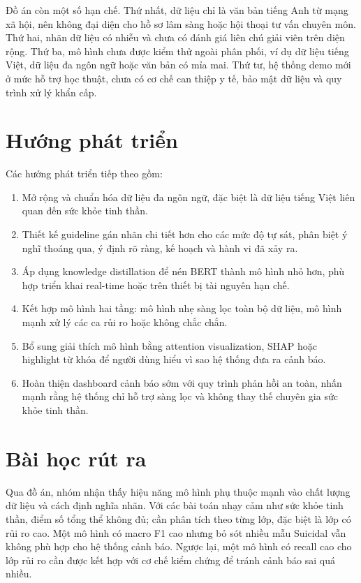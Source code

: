 \documentclass[12pt,a4paper,oneside]{report}
\newlength{\manualparindent}
\newcommand{\manualindent}{\hspace*{\manualparindent}}
\begin{document}
\manualindent%
Đồ án còn một số hạn chế. Thứ nhất, dữ liệu chỉ là văn bản tiếng Anh từ mạng xã hội, nên không đại diện cho hồ sơ lâm sàng hoặc hội thoại tư vấn chuyên môn. Thứ hai, nhãn dữ liệu có nhiễu và chưa có đánh giá liên chú giải viên trên diện rộng. Thứ ba, mô hình chưa được kiểm thử ngoài phân phối, ví dụ dữ liệu tiếng Việt, dữ liệu đa ngôn ngữ hoặc văn bản có mỉa mai. Thứ tư, hệ thống demo mới ở mức hỗ trợ học thuật, chưa có cơ chế can thiệp y tế, bảo mật dữ liệu và quy trình xử lý khẩn cấp.

\section{Hướng phát triển}

Các hướng phát triển tiếp theo gồm:

\begin{enumerate}[label=\arabic*.]
  \item Mở rộng và chuẩn hóa dữ liệu đa ngôn ngữ, đặc biệt là dữ liệu tiếng Việt liên quan đến sức khỏe tinh thần.
  \item Thiết kế guideline gán nhãn chi tiết hơn cho các mức độ tự sát, phân biệt ý nghĩ thoáng qua, ý định rõ ràng, kế hoạch và hành vi đã xảy ra.
  \item Áp dụng knowledge distillation để nén BERT thành mô hình nhỏ hơn, phù hợp triển khai real-time hoặc trên thiết bị tài nguyên hạn chế.
  \item Kết hợp mô hình hai tầng: mô hình nhẹ sàng lọc toàn bộ dữ liệu, mô hình mạnh xử lý các ca rủi ro hoặc không chắc chắn.
  \item Bổ sung giải thích mô hình bằng attention visualization, SHAP hoặc highlight từ khóa để người dùng hiểu vì sao hệ thống đưa ra cảnh báo.
  \item Hoàn thiện dashboard cảnh báo sớm với quy trình phản hồi an toàn, nhấn mạnh rằng hệ thống chỉ hỗ trợ sàng lọc và không thay thế chuyên gia sức khỏe tinh thần.
\end{enumerate}

\section{Bài học rút ra}

\manualindent%
Qua đồ án, nhóm nhận thấy hiệu năng mô hình phụ thuộc mạnh vào chất lượng dữ liệu và cách định nghĩa nhãn. Với các bài toán nhạy cảm như sức khỏe tinh thần, điểm số tổng thể không đủ; cần phân tích theo từng lớp, đặc biệt là lớp có rủi ro cao. Một mô hình có macro F1 cao nhưng bỏ sót nhiều mẫu Suicidal vẫn không phù hợp cho hệ thống cảnh báo. Ngược lại, một mô hình có recall cao cho lớp rủi ro cần được kết hợp với cơ chế kiểm chứng để tránh cảnh báo sai quá nhiều.
\end{document}
